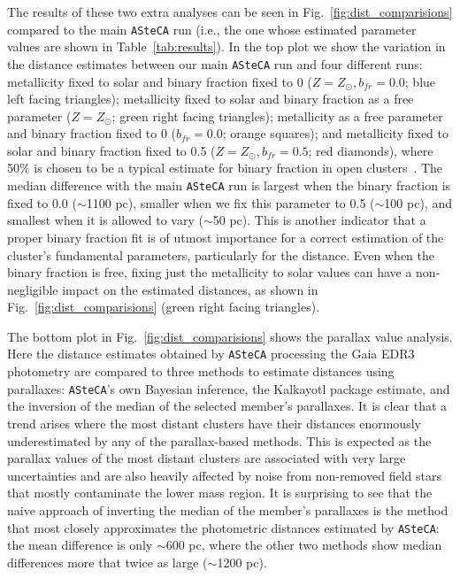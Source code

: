 \documentclass{aa}
\begin{document}
  The results of these two extra analyses can be seen in
  Fig.~\ref{fig:dist_comparisions} compared to the main \texttt{ASteCA} run 
  (i.e., the one whose estimated parameter values are shown in
  Table~\ref{tab:results}).
  In the top plot we show the variation in the distance estimates between our
  main \texttt{ASteCA} run and four different runs: metallicity fixed to solar
  and binary fraction fixed to 0 ($Z=Z_{\odot},b_{fr}=0.0$; blue left
  facing triangles); metallicity fixed to solar and binary fraction as a free
  parameter ($Z=Z_{\odot}$; green right facing triangles); metallicity
  as a free parameter and binary fraction fixed to 0 ($b_{fr}=0.0$; orange
  squares); and metallicity fixed to solar and binary fraction fixed to
  0.5 ($Z=Z_{\odot},b_{fr}=0.5$; red diamonds), where 50\% is
  chosen to be a typical estimate for binary fraction in open
  clusters~\citep{vonHippel_2005}.
  The median difference with the main \texttt{ASteCA} run is largest when the
  binary fraction is fixed to 0.0 ($\sim$1100 pc), smaller when we fix this
  parameter to 0.5 ($\sim$100 pc), and smallest when it is allowed to vary 
  ($\sim$50 pc). This is another indicator that a proper binary fraction fit is
  of utmost importance for a correct  estimation of the cluster's fundamental
  parameters, particularly for the distance. Even when the binary fraction is
  free, fixing just the metallicity to solar values can have a non-negligible impact on the estimated distances, as shown in
  Fig.~\ref{fig:dist_comparisions} (green right facing triangles).

  The bottom plot in Fig.~\ref{fig:dist_comparisions} shows the parallax value
  analysis. Here the distance estimates obtained by \texttt{ASteCA} processing
  the Gaia EDR3 photometry are compared to three methods to estimate distances
  using parallaxes: \texttt{ASteCA}'s own Bayesian inference, the Kalkayotl
  package estimate, and the inversion of the median of the selected member's
  parallaxes. It is clear  that a trend arises where the most distant
  clusters have their distances enormously underestimated by any of the
  parallax-based methods. This is expected as the parallax values of the most
  distant clusters are associated with  very large uncertainties and are also
  heavily affected by noise from non-removed field stars that mostly contaminate
  the lower mass region.
  It is surprising to see that the naive approach of inverting the median of
  the member's parallaxes is the method that most closely approximates the
  photometric distances estimated by \texttt{ASteCA}: the mean difference is
  only $\sim$600 pc, where the other two methods show median differences more
  that twice as large ($\sim$1200 pc).
  \\
\end{document}
